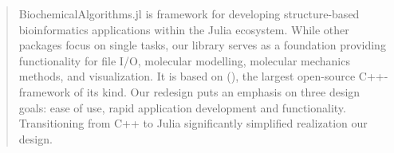 \begin{abstract}
BiochemicalAlgorithms.jl is framework for developing structure-based bioinformatics applications within the Julia ecosystem. While other packages focus on single tasks, our library serves as a foundation providing functionality for file I/O, molecular modelling, molecular mechanics methods, and visualization. It is based on \ballFull (\ball), the largest open-source C++-framework of its kind. Our redesign puts an emphasis on three design goals: ease of use, rapid application development and functionality. Transitioning from C++ to Julia significantly simplified realization our design.
\end{abstract}




